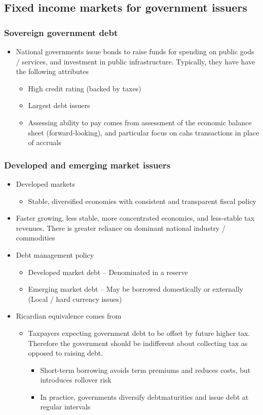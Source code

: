\documentclass[../notes_compiled.tex]{subfiles}
\begin{document}
\subsection{Fixed income markets for government issuers}
\subsubsection{Sovereign government debt}
\begin{itemize}
\item National governments issue bonds to raise funds for spending on public gods / services, and investment in public infrastructure. Typically, they have have the following attributes
\begin{itemize}
\item High credit rating (backed by taxes)
\item Largest debt issuers
\item Assessing ability to pay comes from assessment of the economic balance sheet (forward-looking), and particular focus on cahs transactions in place of accruals
\end{itemize}
\end{itemize}
\subsubsection*{Developed and emerging market issuers}
\begin{itemize}
\item Developed markets
\begin{itemize}
\item Stable, diversified economies with consistent and transparent fiscal policy
\end{itemize}
\item Faster growing, less stable, more concentrated economies, and less-stable tax revenues. There is greater reliance on dominant national industry / commodities
\item Debt management policy
\begin{itemize}
\item Developed market debt -- Denominated in a reserve
\item Emerging market debt -- May be borrowed domestically or externally (Local / hard currency issues)
\end{itemize}
\item Ricardian equivalence comes from
\begin{itemize}
\item Taxpayers expecting government debt to be offset by future higher tax. Therefore the government should be indifferent about collecting tax as opposed to raising debt.
\begin{itemize}
\item Short-term borrowing avoids term premiums and reduces costs, but introduces rollover risk
\item In practice, governments diversify debtmaturities and issue debt at regular intervals
\end{itemize}
\end{itemize}
\end{itemize}
\end{document}

